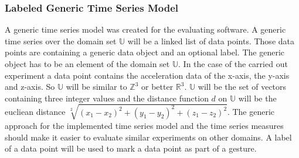 \subsubsection{Labeled Generic Time Series Model} \label{labeled_generic_time_series_model}
A generic time series model was created for the evaluating software. A generic time series over the domain set
$\mathbb{U}$ will be a linked list of data points. Those data points are containing a generic data object and an
optional label. The generic object has to be an element of the domain set $\mathbb{U}$. In the case of the carried out
experiment a data point contains the acceleration data of the x-axis, the y-axis and z-axis. So $\mathbb{U}$ will be
similar to $\mathbb{Z}^3$ or better $\mathbb{R}^3$. $\mathbb{U}$ will be the set of vectors containing three integer
values and the distance function $d$ on $\mathbb{U}$ will be the eucliean distance
$\sqrt[2]{(x_1 - x_2)^2 + (y_1 - y_2)^2 + (z_1 - z_2)^2}$. The generic approach for the implemented time series model
and the time series measures should make it easier to evaluate similar experiments on other domains. A label of a data
point will be used to mark a data point as part of a gesture.
